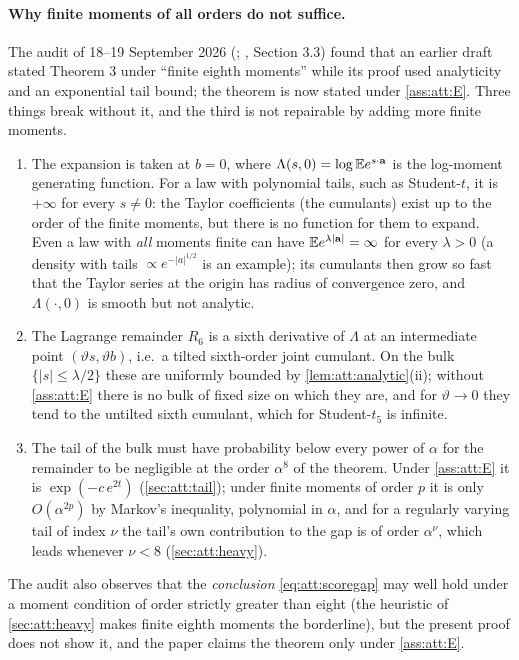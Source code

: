 \paragraph{Why finite moments of all orders do not suffice.}
The audit of 18--19 September 2026 (;
, Section 3.3) found that an earlier draft stated
Theorem 3 under ``finite eighth moments'' while its proof used analyticity and an
exponential tail bound; the theorem is now stated under \cref{ass:att:E}. Three
things break without it, and the third is not repairable by adding more finite
moments.
\begin{enumerate}
\item The expansion is taken at $b=0$, where $\Lambda(s,0)=\log\mathbb{E} e^{s\cdot\mathbf{a}}$ is the
  log-moment generating function. For a law with polynomial tails, such as
  Student-$t$, it is $+\infty$ for every $s\ne0$: the Taylor coefficients (the
  cumulants) exist up to the order of the finite moments, but there is no function
  for them to expand. Even a law with \emph{all} moments finite can have
  $\mathbb{E} e^{\lambda|\mathbf{a}|}=\infty$ for every $\lambda>0$ (a density with tails
  $\propto e^{-|a|^{1/2}}$ is an example); its cumulants then grow so fast that the
  Taylor series at the origin has radius of convergence zero, and $\Lambda(\cdot,0)$
  is smooth but not analytic.
\item The Lagrange remainder $R_6$ is a sixth derivative of $\Lambda$ at an
  intermediate point $(\vartheta s,\vartheta b)$, i.e.\ a tilted sixth-order joint
  cumulant. On the bulk $\{|s|\le\lambda/2\}$ these are uniformly bounded by
  \cref{lem:att:analytic}(ii); without \cref{ass:att:E} there is no bulk of fixed size
  on which they are, and for $\vartheta\to0$ they tend to the untilted sixth cumulant,
  which for Student-$t_5$ is infinite.
\item The tail of the bulk must have probability below every power of $\alpha$ for
  the remainder to be negligible at the order $\alpha^8$ of the theorem. Under
  \cref{ass:att:E} it is $\exp(-c\,e^{2t})$ (\cref{sec:att:tail}); under finite
  moments of order $p$ it is only $O(\alpha^{2p})$ by Markov's inequality, polynomial
  in $\alpha$, and for a regularly varying tail of index $\nu$ the tail's own
  contribution to the gap is of order $\alpha^\nu$, which leads whenever $\nu<8$
  (\cref{sec:att:heavy}).
\end{enumerate}
The audit also observes that the \emph{conclusion} \cref{eq:att:scoregap} may well hold
under a moment condition of order strictly greater than eight (the heuristic of
\cref{sec:att:heavy} makes finite eighth moments the borderline), but the present
proof does not show it, and the paper claims the theorem only under \cref{ass:att:E}.

